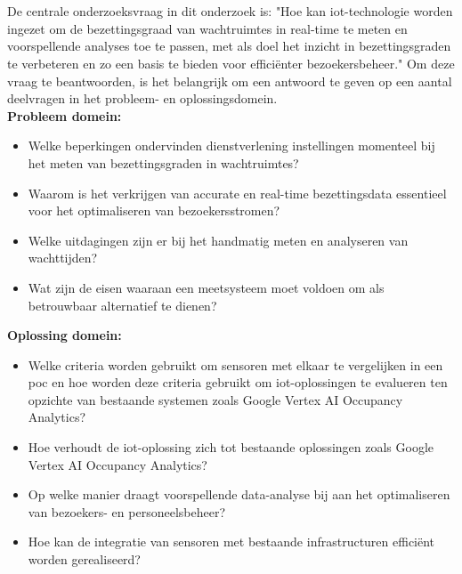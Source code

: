 \section{}%
\label{sec:onderzoeksvraag} 
De centrale onderzoeksvraag in dit onderzoek is: "Hoe kan \gls{iot}-technologie worden ingezet om de bezettingsgraad van wachtruimtes in real-time te meten en voorspellende analyses toe te passen, met als doel het inzicht in bezettingsgraden te verbeteren en zo een basis te bieden voor efficiënter bezoekersbeheer." Om deze vraag te beantwoorden, is het belangrijk om een antwoord te geven op een aantal deelvragen in het probleem- en oplossingsdomein.  \\ 

\textbf{Probleem domein:}
\begin{itemize}
    \item Welke beperkingen ondervinden dienstverlening instellingen momenteel bij het meten van bezettingsgraden in wachtruimtes?
    \item Waarom is het verkrijgen van accurate en real-time bezettingsdata essentieel voor het optimaliseren van bezoekersstromen?
    \item Welke uitdagingen zijn er bij het handmatig meten en analyseren van wachttijden?
    \item Wat zijn de eisen waaraan een meetsysteem moet voldoen om als betrouwbaar alternatief te dienen?
\end{itemize}

\textbf{Oplossing domein:}
\begin{itemize}
    \item Welke criteria worden gebruikt om sensoren met elkaar te vergelijken in een \gls{poc} en hoe worden deze criteria gebruikt om \gls{iot}-oplossingen te evalueren ten opzichte van bestaande systemen zoals Google Vertex AI Occupancy Analytics?
    \item Hoe verhoudt de \gls{iot}-oplossing zich tot bestaande oplossingen zoals Google Vertex AI Occupancy Analytics?
    \item Op welke manier draagt voorspellende data-analyse bij aan het optimaliseren van bezoekers- en personeelsbeheer?
    \item Hoe kan de integratie van sensoren met bestaande infrastructuren efficiënt worden gerealiseerd?
\end{itemize}


